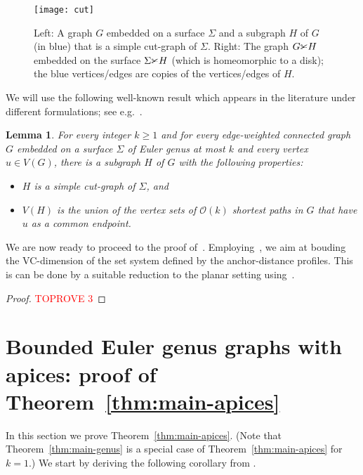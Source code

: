 \documentclass[11pt,a4paper]{article}
\newtheorem{lemma}{Lemma}[section]
\renewcommand{\ge}{\geqslant}
\newcommand{\cutgraph}{\textrm{\CutLeft}}
\begin{document}
\begin{figure}[ht]
  \centering
  \texttt{[image: cut]}
  \caption{Left: A graph $G$ embedded on a surface $\Sigma$ and a subgraph $H$ of $G$ (in blue) that is a simple cut-graph of $\Sigma$. Right: The graph $G\cutgraph H$ embedded on the surface $\Sigma\cutgraph H$ (which is homeomorphic to a disk); the blue vertices/edges are copies of the vertices/edges of $H$.}
  \label{fig:cutopen}
\end{figure}

We will use the following well-known result which appears in the literature under different formulations; see e.g.~\cite{BorradaileDT14,CabelloCL12algo,EricksonW05}.

\begin{lemma}\label{lem:genuscut}
  For every integer $k\ge 1$ and for every edge-weighted connected graph $G$ embedded on a surface $\Sigma$ of Euler genus at most $k$ and every vertex $u\in V(G)$, there is a subgraph $H$ of $G$ with the following properties:
  \begin{itemize}[nosep]
    \item  $H$ is a simple cut-graph of $\Sigma$, and
    \item  $V(H)$ is the union of the vertex sets of $\mathcal{O}(k)$ shortest paths in $G$ that have $u$ as a common endpoint.
  \end{itemize}
  \end{lemma}

We are now ready to proceed to the proof of~.
Employing~,
we aim at bouding the VC-dimension of the set system defined by the anchor-distance profiles.
This is can be done by a suitable reduction to the planar setting using~.



\begin{proof}\textcolor{red}{TOPROVE 3}\end{proof}
 
\section{Bounded Euler genus graphs with apices: proof of Theorem~\ref{thm:main-apices}}\label{sec:algo-genus}

In this section we prove Theorem~\ref{thm:main-apices}.
(Note that Theorem~\ref{thm:main-genus} is a special case of Theorem~\ref{thm:main-apices}
 for $k=1$.)
We start by deriving the following corollary from .
\end{document}
